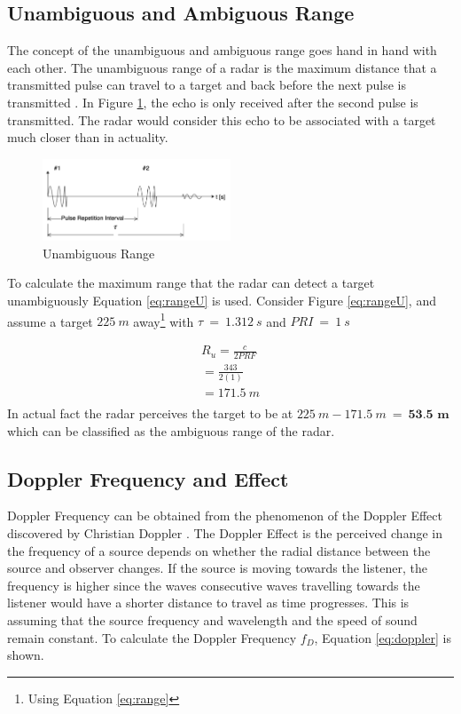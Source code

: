 \subsection{Unambiguous and Ambiguous Range}
The concept of the unambiguous and ambiguous range goes hand in hand with each other. The unambiguous range of a radar is the maximum distance that a transmitted pulse can travel to a target and back before the next pulse is transmitted \cite{noauthor_radar_nodate-1}. In Figure \ref{fig:rangeU}, the echo is only received after the second pulse is transmitted. The radar would consider this echo to be associated with a target much closer than in actuality.
\begin{figure}[h!]
    \centering
    \includegraphics[width = 0.5\textwidth]{images/RangeU.pdf}
    \caption{Unambiguous Range}\label{fig:rangeU}
\end{figure}
To calculate the maximum range that the radar can detect a target unambiguously Equation \ref{eq:rangeU} is used. Consider Figure \ref{eq:rangeU}, and assume a target $225\ m$ away\footnote{Using Equation \ref{eq:range}} with $\tau\ =\ 1.312\ s $ and $PRI\ =\ 1\ s$

\begin{equation}
\begin{align*}
R_u = \frac{c}{2PRF}\\ = \frac{343}{2(1)}\\
= 171.5\ m\\ \label{eq:rangeU}
\end{align*}
\end{equation}
In actual fact the radar perceives the target to be at $225\ m - 171.5\ m\ =\ \textbf{53.5 m}$which can be classified as the ambiguous range of the radar.
\subsection{Doppler Frequency and Effect}
Doppler Frequency can be obtained from the phenomenon of the Doppler Effect discovered by Christian Doppler \cite{noauthor_radar_nodate-2}. The Doppler Effect is the perceived change in the frequency of a source depends on whether the radial distance between the source and observer changes. If the source is moving towards the listener, the frequency is higher since the waves consecutive waves travelling towards the listener would have a shorter distance to travel as time progresses. This is assuming that the source frequency and wavelength and the speed of sound remain constant. To calculate the Doppler Frequency $f_D$, Equation \ref{eq:doppler} is shown.

